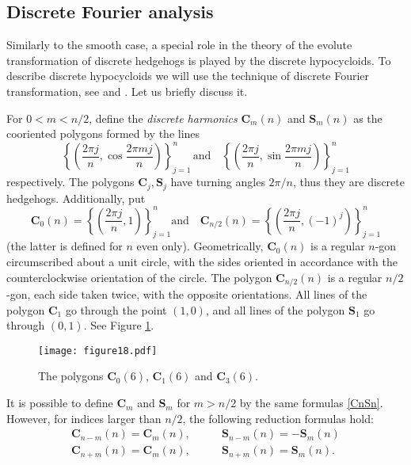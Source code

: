 \documentclass[12pt]{article}
\begin{document}
\subsection{Discrete Fourier analysis}
\label{Fourier}
Similarly to the smooth case, a special role in the theory of the evolute transformation of discrete hedgehogs is played by the discrete hypocycloids. To describe discrete hypocycloids we will use the technique of discrete Fourier transformation, see \cite{Sch1} and \cite{Ion}.
Let us briefly discuss it. 

For $0 < m < n/2$, define the \emph{discrete harmonics} $\mathbf{C}_m(n)$ and $\mathbf{S}_m(n)$ as the cooriented polygons formed by the lines
\begin{equation}
\label{CnSn}
\left\{\left(\frac{2\pi j}n, \cos \frac{2\pi m j}n \right)\right\}_{j = 1}^n\,\mbox{and} \quad \left\{\left(\frac{2\pi j}n, \sin \frac{2\pi m j}n \right)\right\}_{j = 1}^n
\end{equation}
respectively. The polygons $\mathbf{C}_j, \mathbf{S}_j$ have turning angles $2\pi/n$, thus they are discrete hedgehogs. Additionally, put
\[ \mathbf{C}_0(n) = \left\{\left(\frac{2\pi j}n, 1 \right)\right\}_{j=1}^n \mbox{and} \quad \mathbf{C}_{n/2}(n) = \left\{\left( \frac{2\pi j}n, (-1)^j \right)\right\}_{j=1}^n\]
(the latter is defined for $n$ even only). Geometrically, $\mathbf{C}_0(n)$ is a regular $n$-gon circumscribed about a unit circle, with the sides oriented in accordance with the counterclockwise orientation of the circle. The polygon $\mathbf{C}_{n/2}(n)$ is a regular $n/2$-gon, each side taken twice, with the opposite orientations. All lines of the polygon $\mathbf{C}_1$ go through the point $(1,0)$, and all lines of the polygon $\mathbf{S}_1$ go through $(0,1)$. See Figure \ref{SpecHedge}.

\begin{figure}[htbp]
	\centering
	\texttt{[image: figure18.pdf]}
	\caption{The polygons $\mathbf{C}_0(6)$, $\mathbf{C}_1(6)$ and 
		$\mathbf{C}_3(6)$.}
	\label{SpecHedge}
\end{figure}


It is possible to define $\mathbf{C}_m$ and $\mathbf{S}_m$ for $m > n/2$ by the same formulas \eqref{CnSn}.  However, for indices larger than $n/2$, the following reduction formulas hold:
\begin{equation}\label{reduction_formulas}
\begin{array}{ll}
\mathbf{C}_{n-m}(n) = \mathbf{C}_m(n), &\qquad \mathbf{S}_{n-m}(n) = -\mathbf{S}_m(n)\\ 
\mathbf{C}_{n+m}(n) = \mathbf{C}_m(n), &\qquad \mathbf{S}_{n+m}(n) = \mathbf{S}_m(n).
\end{array}
\end{equation}
\end{document}
